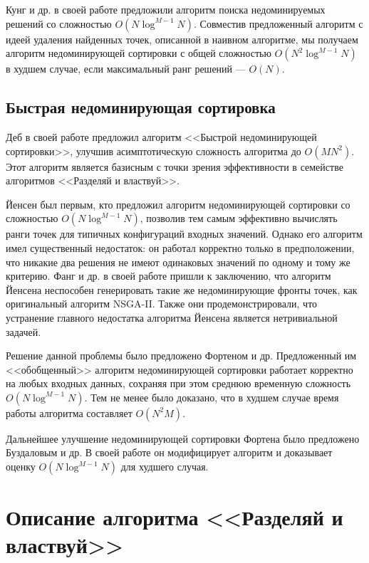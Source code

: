 Кунг и др. в своей работе предложили алгоритм поиска недоминируемых решений со сложностью $O(N\log^{M-1}N)$. Совместив предложенный алгоритм с идеей удаления найденных точек, описанной в наивном алгоритме, мы получаем алгоритм недоминирующей сортировки с общей сложностью $O(N^2\log^{M-1}N)$ в худшем случае, если максимальный ранг решений --- $O(N)$.

\subsection{Быстрая недоминирующая сортировка}
Деб в своей работе предложил алгоритм <<Быстрой недоминирующей сортировки>>, улучшив асимптотическую сложность алгоритма до $O(MN^2)$. Этот алгоритм является базисным с точки зрения эффективности в семействе алгоритмов <<Разделяй и властвуй>>.

Йенсен был первым, кто предложил алгоритм недоминирующей сортировки со сложностью $O(N\log^{M-1}N)$, позволив тем самым эффективно вычислять ранги точек для типичных конфигураций входных значений. Однако его алгоритм имел существенный недостаток: он работал корректно только в предположении, что никакие два решения не имеют одинаковых значений по одному и тому же критерию. Фанг и др. в своей работе пришли к заключению, что алгоритм Йенсена неспособен генерировать такие же недоминирующие фронты точек, как оригинальный алгоритм NSGA-II. Также они продемонстрировали, что устранение главного недостатка алгоритма Йенсена является нетривиальной задачей.

Решение данной проблемы было предложено Фортеном и др. Предложенный им <<обобщенный>> алгоритм недоминирующей сортировки работает корректно на любых входных данных, сохраняя при этом среднюю временную сложность $O(N\log^{M-1}N)$. Тем не менее было доказано, что в худшем случае время работы алгоритма составляет $O(N^2M)$.

Дальнейшее улучшение недоминирующей сортировки Фортена было предложено Буздаловым и др. В своей работе он модифицирует алгоритм и доказывает оценку $O(N\log^{M-1}N)$ для худшего случая.

\section{Описание алгоритма <<Разделяй и властвуй>>}
